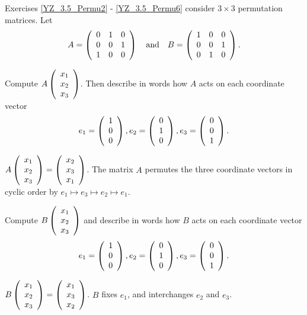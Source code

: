 \documentclass{ximera}
\begin{document}
Exercises \ref{YZ_3.5_Permu2} - \ref{YZ_3.5_Permu6} consider $3\times 3$ permutation matrices. Let 
\[
A=\Matrix{0&1&0\\0&0&1\\1&0&0} \AND B=\Matrix{1&0&0\\0&0&1\\0&1&0}.
\]



\begin{exercise}\label{YZ_3.5_Permu2}
Compute $A\Matrix{x_1\\x_2\\x_3}$.  Then describe in words how $A$ acts on each coordinate vector 
\[
e_1=\Matrix{1\\0\\0}, e_2=\Matrix{0\\1\\0}, e_3=\Matrix{0\\0\\1}.
\]

\begin{solution}
\ans $A\Matrix{x_1\\x_2\\x_3} =\Matrix{x_2\\x_3\\x_1}$.  The matrix $A$ permutes the three coordinate vectors in cyclic order by $e_1\mapsto e_3\mapsto e_2\mapsto e_1$.
\end{solution}
\end{exercise}


\begin{exercise}\label{YZ_3.5_Permu3}
Compute $B\Matrix{x_1\\x_2\\x_3}$ and describe in words how $B$ acts on each coordinate vector
\[
e_1=\Matrix{1\\0\\0}, e_2=\Matrix{0\\1\\0}, e_3=\Matrix{0\\0\\1}.
\]

\begin{solution}
\ans $B \Matrix{x_1\\x_2\\x_3} = \Matrix{x_1\\x_3\\x_2}$. $B$ fixes $e_1$, and interchanges $e_2$ and $e_3$.

\end{solution}
\end{exercise}
\end{document}
